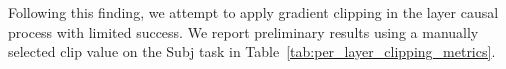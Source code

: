 

Following this finding, we attempt to apply gradient clipping in the layer causal process with limited success.
We report preliminary results using a manually selected clip value on the Subj task in Table~\ref{tab:per_layer_clipping_metrics}.



% 
